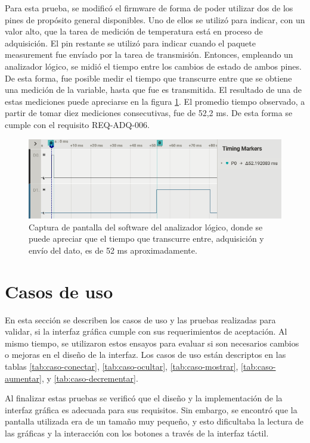 Para esta prueba, se modificó el firmware de forma de poder utilizar dos de los pines de propósito general disponibles. Uno de ellos se utilizó para indicar, con un valor alto, que la tarea de medición de temperatura está en proceso de adquisición. El pin restante se utilizó para indicar cuando el paquete measurement fue envíado por la tarea de transmisión. Entonces, empleando un analizador lógico, se midió el tiempo entre los cambios de estado de ambos pines. De esta forma, fue posible medir el tiempo que transcurre entre que se obtiene una medición de la variable, hasta que fue es transmitida. El resultado de una de estas mediciones puede apreciarse en la figura \ref{fig:tiempo-envio}. El promedio tiempo observado, a partir de tomar diez mediciones consecutivas, fue de 52,2 ms. De esta forma se cumple con el requisito REQ-ADQ-006.

\begin{figure}[htpb]
\centering
\includegraphics[width=\textwidth]{./Figures/tiempo-envio.png}
\caption{Captura de pantalla del software del analizador lógico, donde se puede apreciar que el tiempo que transcurre entre, adquisición y envío del dato, es de 52 ms aproximadamente.}
\label{fig:tiempo-envio}
\end{figure}

\section{Casos de uso}

En esta sección se describen los casos de uso y las pruebas realizadas para validar, si la interfaz gráfica cumple con sus requerimientos de aceptación. Al mismo tiempo, se utilizaron estos ensayos para evaluar si son necesarios cambios o mejoras en el diseño de la interfaz. Los casos de uso están descriptos en las tablas  \ref{tab:caso-conectar}, \ref{tab:caso-ocultar}, \ref{tab:caso-mostrar}, \ref{tab:caso-aumentar}, y \ref{tab:caso-decrementar}.

Al finalizar estas pruebas se verificó que el diseño y la implementación de la interfaz gráfica es adecuada para sus requisitos. Sin embargo, se encontró que la pantalla utilizada era de un tamaño muy pequeño, y esto dificultaba la lectura de las gráficas y la interacción con los botones a través de la interfaz táctil.

